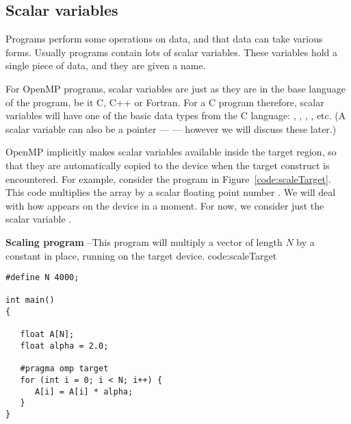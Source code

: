\subsection{Scalar variables}


Programs perform some operations on data, and that data can take various forms.
Usually programs contain lots of scalar variables.
These variables hold a single piece of data, and they are given a name.

For OpenMP programs, scalar variables are just as they are in the base language of the program, be it C, C++ or Fortran.
For a C program therefore, scalar variables will have one of the basic data types from the C language: , , , , etc.
(A scalar variable can also be a pointer ---  --- however we will discuss these later.)

OpenMP implicitly makes scalar variables available inside the target region, so that they are automatically copied to the device when the target construct is encountered.
For example, consider the program in Figure~\ref{code:scaleTarget}.
This code multiplies the array  by a scalar floating point number .
We will deal with how  appears on the device in a moment.
For now, we consider just the scalar variable .

\begin{CodeExample}%
{\textbf{Scaling program} --\small This program will multiply a vector of length $N$
by a constant in place, running on the target device.
}%
{code:scaleTarget}
\begin{lstlisting}
#define N 4000;

int main()
{

   float A[N];
   float alpha = 2.0;

   #pragma omp target
   for (int i = 0; i < N; i++) {
      A[i] = A[i] * alpha;
   }
}	  
\end{lstlisting}
\end{CodeExample}

